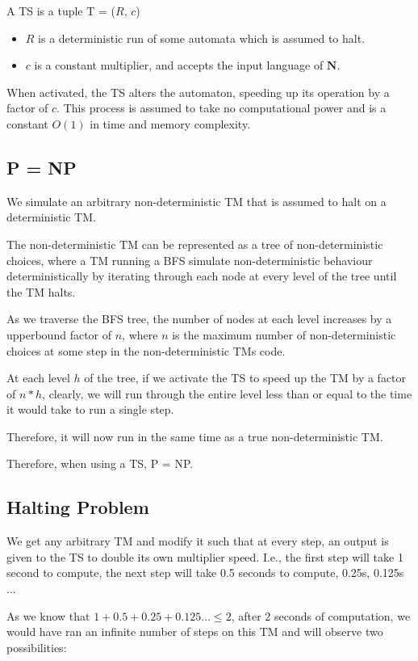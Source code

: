 \documentclass{report}
\begin{document}
A TS is a tuple T = ($R$, $c$)

\begin{itemize}
  \item $R$ is a deterministic run of some automata which is assumed to halt.
  \item $c$ is a constant multiplier, and accepts the input language of $\mathbf{N}$.
\end{itemize}

When activated, the TS alters the automaton, speeding up its operation by a factor of $c$. This process is assumed to take no computational power and is a constant $O(1)$ in time and memory complexity.

\subsection{P = NP}

We simulate an arbitrary non-deterministic TM that is assumed to halt on a deterministic TM. \cite{simulate-non-determinisim}

The non-deterministic TM can be represented as a tree of non-deterministic choices, where a TM running a BFS simulate non-deterministic behaviour deterministically by iterating through each node at every level of the tree until the TM halts.

As we traverse the BFS tree, the number of nodes at each level increases by a upperbound factor of $n$, where $n$ is the maximum number of non-deterministic choices at some step in the non-deterministic TMs code.

At each level $h$ of the tree, if we activate the TS to speed up the TM by a factor of $n*h$, clearly, we will run through the entire level less than or equal to the time it would take to run a single step.

Therefore, it will now run in the same time as a true non-deterministic TM.

Therefore, when using a TS, P = NP.

\subsection{Halting Problem}

We get any arbitrary TM and modify it such that at every step, an output is given to the TS to double its own multiplier speed. I.e., the first step will take 1 second to compute, the next step will take 0.5 seconds to compute, 0.25s, 0.125s ...

As we know that $1 + 0.5 + 0.25 + 0.125 ... \le 2$, after 2 seconds of computation, we would have ran an infinite number of steps on this TM and will observe two possibilities:
\end{document}
